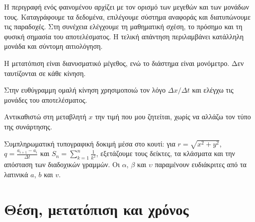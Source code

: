 Η περιγραφή ενός φαινομένου αρχίζει με τον ορισμό των μεγεθών και των μονάδων
τους. Καταγράφουμε τα δεδομένα, επιλέγουμε σύστημα αναφοράς και διατυπώνουμε
τις παραδοχές. Στη συνέχεια ελέγχουμε τη μαθηματική σχέση, το πρόσημο και τη
φυσική σημασία του αποτελέσματος. Η τελική απάντηση περιλαμβάνει κατάλληλη
μονάδα και σύντομη αιτιολόγηση.\par

\begin{AttentionBox}
Η μετατόπιση είναι διανυσματικό μέγεθος, ενώ το διάστημα είναι μονόμετρο. Δεν ταυτίζονται σε κάθε κίνηση.
\end{AttentionBox}

\begin{ThinkBox}
Στην ευθύγραμμη ομαλή κίνηση χρησιμοποιώ τον λόγο \(\Delta x/\Delta t\) και ελέγχω τις μονάδες του αποτελέσματος.
\end{ThinkBox}

\begin{ThinkBox}
Αντικαθιστώ στη μεταβλητή \(x\) την τιμή που μου ζητείται, χωρίς να αλλάζω τον τύπο της συνάρτησης.
\end{ThinkBox}


\begin{ThinkBox}
Συμπληρωματική τυπογραφική δοκιμή μέσα στο κουτί:
για $r=\sqrt{x^2+y^2}$, $q=\frac{a_{i+1}-a_i}{\Delta t}$ και
$S_n=\sum_{k=1}^{n}\frac{1}{k^2}$, εξετάζουμε τους δείκτες, τα κλάσματα
και την απόσταση των διαδοχικών γραμμών. Οι $\alpha$, $\beta$ και $\upsilon$
παραμένουν ευδιάκριτες από τα λατινικά $a$, $b$ και $v$.
\end{ThinkBox}

\clearpage
\section{Θέση, μετατόπιση και χρόνος}

\begin{center}


\end{center}

